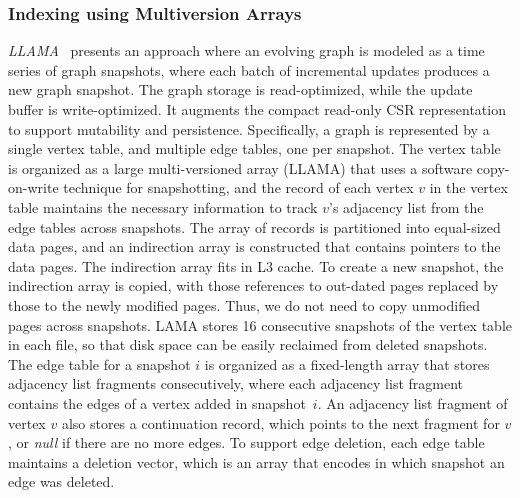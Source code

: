 \documentclass[graybox, natbib, nosecnum, twocolumn]{svmult}
\begin{document}
\subsubsection{Indexing using Multiversion Arrays}
{\em LLAMA}~\citep{macko2015llama} presents an approach where an evolving graph is modeled as a time series of graph snapshots, where each batch of incremental updates produces a new graph snapshot. The graph storage is read-optimized, while the update buffer is write-optimized. 
It augments the compact read-only CSR representation to support mutability and persistence. Specifically, a graph is represented by a single vertex table, and multiple edge tables, one per snapshot. The vertex table is organized as a large multi-versioned array (LLAMA) that uses a software copy-on-write technique for snapshotting, and the record of each vertex $v$ in the vertex table maintains the necessary information to track $v$'s adjacency list from the edge tables across snapshots. 
The array of records is partitioned into equal-sized data pages, and an indirection array is constructed that contains pointers to the data pages. The indirection array fits in L3 cache. To create a new snapshot, the indirection array is copied, with those references to out-dated pages replaced by those to the newly modified pages. Thus, we do not need to copy unmodified pages across snapshots. LAMA stores 16 consecutive snapshots of the vertex table in each file, so that disk space can be easily reclaimed from deleted snapshots. 
The edge table for a snapshot $i$ is organized as a fixed-length array that stores adjacency list fragments consecutively, where each adjacency list fragment contains the edges of a vertex added in snapshot~$i$. An adjacency list fragment of vertex $v$ also stores a continuation record, which points to the next fragment for $v$, or {\em null} if there are no more edges. To support edge deletion, each edge table maintains a deletion vector, which is an array that encodes in which snapshot an edge was deleted.


\end{document}
